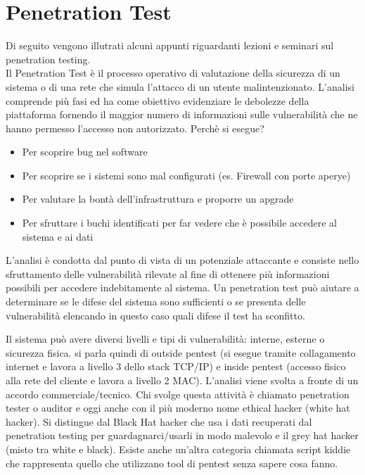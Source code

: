 \appendix
\chapter{Penetration Test}
Di seguito vengono illutrati alcuni appunti riguardanti lezioni e seminari sul penetration testing.\\

Il Penetration Test è il processo operativo di valutazione della sicurezza di un sistema o di una rete che simula l'attacco di un utente malintenzionato. L'analisi comprende più fasi ed ha come obiettivo evidenziare le debolezze della piattaforma fornendo il maggior numero di informazioni sulle vulnerabilità che ne hanno permesso l'accesso non autorizzato. Perchè si esegue?
\begin{itemize}
\item Per scoprire bug nel software
\item Per scoprire se i sistemi sono mal configurati (es. Firewall con porte aperye)
\item Per valutare la bontà dell'infrastruttura e proporre un apgrade
\item Per sfruttare i buchi identificati per far vedere che è possibile accedere al sistema e ai dati
\end{itemize}

L'analisi è condotta dal punto di vista di un potenziale attaccante e consiste nello sfruttamento delle vulnerabilità rilevate al fine di ottenere più informazioni possibili per accedere indebitamente al sistema. Un penetration test può aiutare a determinare se le difese del sistema sono sufficienti o se presenta delle vulnerabilità elencando in questo caso quali difese il test ha sconfitto. 

Il sistema può avere diversi livelli e tipi di vulnerabilità: interne, esterne o sicurezza fisica. si parla quindi di outside pentest (si esegue tramite collagamento internet e lavora a livello 3 dello stack TCP/IP) e inside pentest (accesso fisico alla rete del cliente e lavora a livello 2 MAC).  L'analisi viene svolta a fronte di un accordo commerciale/tecnico. Chi svolge questa attività è chiamato penetration tester o auditor e oggi anche con il più moderno nome ethical hacker (white hat hacker). Si distingue dal Black Hat hacker che usa i dati recuperati dal penetration testing per guardagnarci/usarli in modo malevolo e il grey hat hacker (misto tra white e black). Esiste anche un'altra categoria chiamata script kiddie che rappresenta quello che utilizzano tool di pentest senza sapere cosa fanno.


